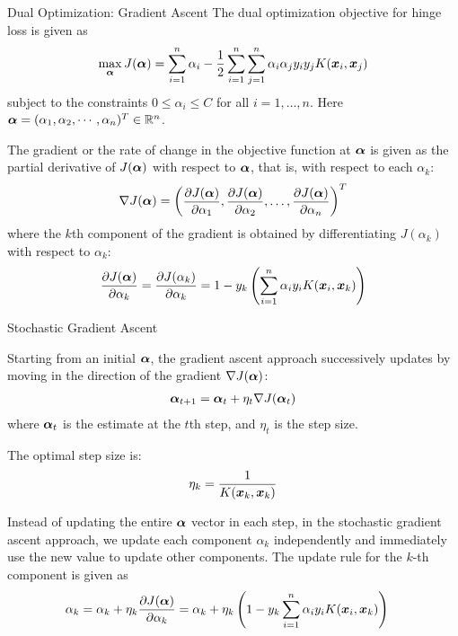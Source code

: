 \begin{frame}{Dual Optimization: Gradient Ascent}
The dual optimization objective for
hinge loss  is given as
\begin{align*}
    \max_{{\bm \alpha}} J({\bm \alpha}) =
    \displaystyle \sum_{i=1}^n\alpha_{i} - {1 \over 2} \displaystyle \sum_{i=1}^n
  \displaystyle \sum_{j=1}^n \alpha_i\alpha_{j} y_i y_{j} K({\boldsymbol x}_i,{\boldsymbol x}_{j})
\end{align*}
subject to the constraints $0 \le \alpha_i \le C$ for all
$i=1,\ldots,n$. Here ${\bm \alpha} = (\alpha_1, \alpha_2, \cdots, \alpha_n)^T
\in {\mathord{\mathbb R}}^n$.

\medskip
The gradient or the rate of change in the objective function at
${\bm \alpha}$ is given as the partial derivative of $J({\bm \alpha})$ with
respect to ${\bm \alpha}$, that is, with respect to each $\alpha_k$:
\begin{align*}
    \nabla J({\bm \alpha}) =
   \begin{pmatrix}  \dfrac{\partial J({\bm \alpha})}{\partial \alpha_1},
    \dfrac{\partial J({\bm \alpha})}{\partial \alpha_2}, \ldots,
    \dfrac{\partial J({\bm \alpha})}{\partial \alpha_n}
     \end{pmatrix}^T
\end{align*}
where the $k$th component of the gradient is obtained by
differentiating $J(\alpha_k)$ with respect to $\alpha_k$:
\begin{align*}
    {\partial J({\bm \alpha}) \over \partial \alpha_k} =
    {\partial J(\alpha_k) \over \partial \alpha_k} =
    1 - y_k
    \left( \displaystyle \sum_{i=1}^n \alpha_i y_i K({\boldsymbol x}_i,{\boldsymbol x}_k) \right)
\end{align*}
\end{frame}


\begin{frame}{Stochastic Gradient Ascent}

  Starting from an initial ${\bm \alpha}$, the
gradient ascent approach successively updates by moving in the direction
of the gradient $\nabla J({\bm \alpha})$:
\begin{align*}
    {\bm \alpha}_{t+1} = {\bm \alpha}_t + \eta_t \nabla J({\bm \alpha}_t)
\end{align*}
where ${\bm \alpha}_t$ is the estimate at the $t$th step, and $\eta_t$ is the
step size. 

\medskip
The optimal step size is:
\begin{align*}
    \eta_k = {1 \over K({\boldsymbol x}_k, {\boldsymbol x}_k)}
\end{align*}

\medskip
Instead of updating the entire ${\bm \alpha}$ vector in each step, in
the stochastic gradient ascent approach, we update each component $\alpha_k$ independently and immediately
use the new value to update other components. 
The update rule for the $k$-th component
is given as
\begin{align*}
    \alpha_{k} & = \alpha_{k} + \eta_{k}
    \dfrac{\partial J({\bm \alpha})}{\partial \alpha_k}
    = \alpha_{k} + \eta_{k}
    \left(1 - y_k\displaystyle \sum_{i=1}^n \alpha_i y_i K({\boldsymbol x}_i,{\boldsymbol x}_k)
    \right)
\end{align*}
\end{frame}



